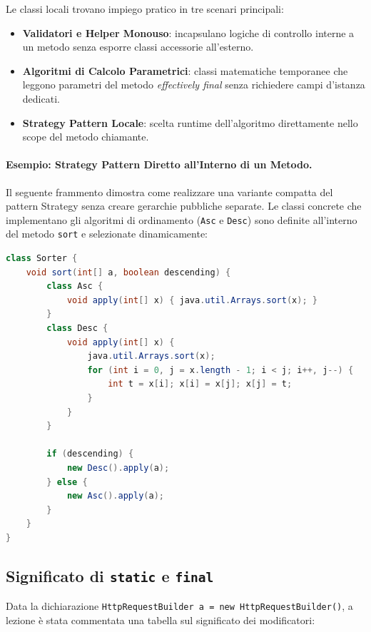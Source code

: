 \documentclass[12pt]{extarticle}
\begin{document}
\noindent Le classi locali trovano impiego pratico in tre scenari principali:
\begin{itemize}
    \item \textbf{Validatori e Helper Monouso}: incapsulano logiche di controllo interne a un metodo senza esporre classi accessorie all'esterno.
    \item \textbf{Algoritmi di Calcolo Parametrici}: classi matematiche temporanee che leggono parametri del metodo \textit{effectively final} senza richiedere campi d'istanza dedicati.
    \item \textbf{Strategy Pattern Locale}: scelta runtime dell'algoritmo direttamente nello scope del metodo chiamante.
\end{itemize}

\paragraph{Esempio: Strategy Pattern Diretto all'Interno di un Metodo.}
Il seguente frammento dimostra come realizzare una variante compatta del pattern Strategy senza creare gerarchie pubbliche separate. Le classi concrete che implementano gli algoritmi di ordinamento (\texttt{Asc} e \texttt{Desc}) sono definite all'interno del metodo \texttt{sort} e selezionate dinamicamente:
\begin{lstlisting}[language=Java]
class Sorter {
    void sort(int[] a, boolean descending) {
        class Asc {
            void apply(int[] x) { java.util.Arrays.sort(x); }
        }
        class Desc {
            void apply(int[] x) {
                java.util.Arrays.sort(x);
                for (int i = 0, j = x.length - 1; i < j; i++, j--) {
                    int t = x[i]; x[i] = x[j]; x[j] = t;
                }
            }
        }

        if (descending) {
            new Desc().apply(a);
        } else {
            new Asc().apply(a);
        }
    }
}
\end{lstlisting}

\subsection{Significato di \texttt{static} e \texttt{final}}

\noindent Data la dichiarazione \texttt{HttpRequestBuilder a = new HttpRequestBuilder()}, a lezione è stata commentata una tabella sul significato dei modificatori:
\end{document}
